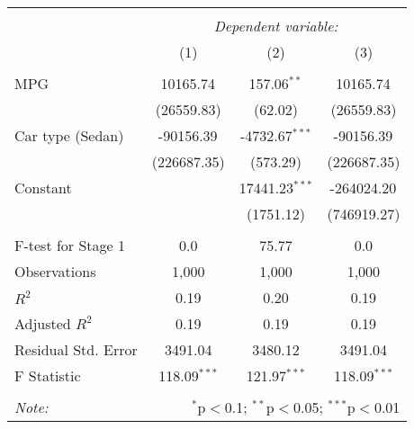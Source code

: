 \begin{table}[!htbp] \centering
\begin{tabular}{@{\extracolsep{5pt}}lccc}
\\[-1.8ex]\hline
\hline \\[-1.8ex]
& \multicolumn{3}{c}{\textit{Dependent variable:}} \
\cr \cline{3-4}
\\[-1.8ex] & (1) & (2) & (3) \\
\hline \\[-1.8ex]
 MPG & 10165.74$^{}$ & 157.06$^{**}$ & 10165.74$^{}$ \\
  & (26559.83) & (62.02) & (26559.83) \\
 Car type (Sedan) & -90156.39$^{}$ & -4732.67$^{***}$ & -90156.39$^{}$ \\
  & (226687.35) & (573.29) & (226687.35) \\
 Constant & & 17441.23$^{***}$ & -264024.20$^{}$ \\
  & & (1751.12) & (746919.27) \\
\hline \\[-1.8ex]
 F-test for Stage 1 & 0.0 & 75.77 & 0.0 \\
 Observations & 1,000 & 1,000 & 1,000 \\
 $R^2$ & 0.19 & 0.20 & 0.19 \\
 Adjusted $R^2$ & 0.19 & 0.19 & 0.19 \\
 Residual Std. Error & 3491.04 & 3480.12 & 3491.04  \\
 F Statistic & 118.09$^{***}$  & 121.97$^{***}$  & 118.09$^{***}$  \\
\hline
\hline \\[-1.8ex]
\textit{Note:} & \multicolumn{3}{r}{$^{*}$p$<$0.1; $^{**}$p$<$0.05; $^{***}$p$<$0.01} \\
\end{tabular}
\end{table}